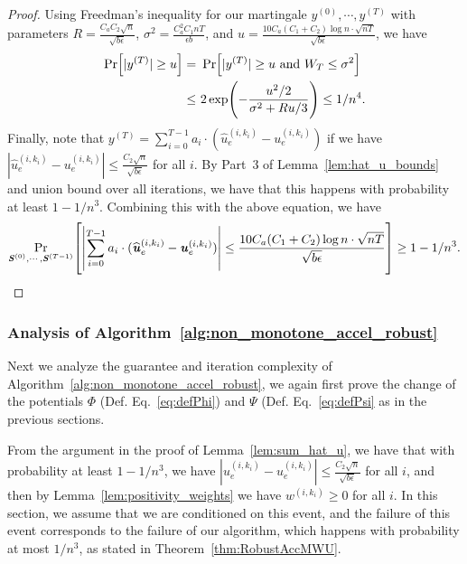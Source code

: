 \documentclass[11pt]{article}
\let\originalleft\left
\let\originalright\right
\renewcommand{\left}{\mathopen{}\mathclose\bgroup\originalleft}
\renewcommand{\right}{\aftergroup\egroup\originalright}
\newcommand\uu{\boldsymbol{\mathit{u}}}
\newcommand\ww{\boldsymbol{\mathit{w}}}
\renewcommand\SS{\boldsymbol{\mathit{S}}}
\newcommand{\wh}{\widehat}
\begin{document}
\begin{proof}
Using Freedman's inequality for our martingale $y^{(0)}, \cdots, y^{(T)}$ with parameters $R = \frac{C_a C_2 \sqrt{n}}{\sqrt{b \epsilon}}$, $\sigma^2 = \frac{C_a^2 C_1 n T}{\epsilon b}$, and $u = \frac{10 C_a (C_1 + C_2) \log n \cdot \sqrt{nT}}{\sqrt{b \epsilon}}$, we have 
\begin{align*}
\Pr\left[ |y^{(T)}| \geq u \right] =
&~ \Pr\left[ |y^{(T)}| \geq u \text{ and } W_T \leq \sigma^2 \right] \\
\leq &~ 2 \exp\left(-\frac{u^2/2}{\sigma^2 + R u / 3}\right) \leq 1/n^4.
\end{align*}
Finally, note that $y^{(T)} = \sum_{i=0}^{T-1} a_i \cdot (\wh{\uu}_e^{(i,k_i)} - \uu_e^{(i,k_i)})$ if we have $|\wh{\uu}_e^{(i,k_i)} - \uu_e^{(i,k_i)}| \leq \frac{C_2 \sqrt{n}}{\sqrt{b \epsilon}}$ for all $i$. By Part~3 of Lemma~\ref{lem:hat_u_bounds} and union bound over all iterations, we have that this happens with probability at least $1-1/n^3$. Combining this with the above equation, we have
\[
\Pr_{\SS^{(0)},\cdots,\SS^{(T-1)}}\left[ \left|\sum_{i=0}^{T-1} a_i \cdot (\wh{\uu}^{(i,k_i)}_e - \uu^{(i,k_i)}_e)\right| \leq \frac{10 C_a (C_1 + C_2) \log n \cdot \sqrt{nT}}{\sqrt{b \epsilon}} \right] \geq 1 - 1/n^3.
\]
\end{proof}



\subsubsection{Analysis of Algorithm~\ref{alg:non_monotone_accel_robust}}
Next we analyze the guarantee and iteration complexity of Algorithm~\ref{alg:non_monotone_accel_robust}, we again first prove the change of the potentials $\Phi$ (Def. Eq.~\eqref{eq:defPhi}) and $\Psi$ (Def. Eq.~\eqref{eq:defPsi} as in the previous sections. 

From the argument in the proof of Lemma~\ref{lem:sum_hat_u}, we have that with probability at least $1-1/n^3$, we have $|\wh{\uu}_e^{(i,k_i)} - \uu_e^{(i,k_i)}| \leq \frac{C_2 \sqrt{n}}{\sqrt{b \epsilon}}$ for all $i$, and then by Lemma~\ref{lem:positivity_weights} we have $\ww^{(i,k_i)} \geq 0$ for all $i$. In this section, we assume that we are conditioned on this event, and the failure of this event corresponds to the failure of our algorithm, which happens with probability at most $1/n^3$, as stated in Theorem~\ref{thm:RobustAccMWU}.
\end{document}
